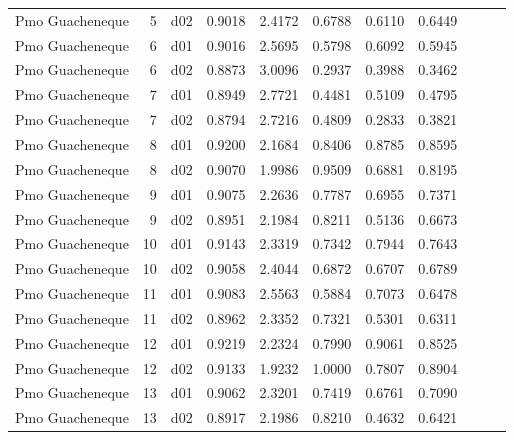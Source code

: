 \begin{landscape}
\begin{longtable}{p{2cm}rrrrrrrrrr}
      Pmo Guacheneque  &          5 &     d02 &   0.9018 &  2.4172 &        0.6788 &           0.6110 &  0.6449 \\
      Pmo Guacheneque  &          6 &     d01 &   0.9016 &  2.5695 &        0.5798 &           0.6092 &  0.5945 \\
      Pmo Guacheneque  &          6 &     d02 &   0.8873 &  3.0096 &        0.2937 &           0.3988 &  0.3462 \\
      Pmo Guacheneque  &          7 &     d01 &   0.8949 &  2.7721 &        0.4481 &           0.5109 &  0.4795 \\
      Pmo Guacheneque  &          7 &     d02 &   0.8794 &  2.7216 &        0.4809 &           0.2833 &  0.3821 \\
      Pmo Guacheneque  &          8 &     d01 &   0.9200 &  2.1684 &        0.8406 &           0.8785 &  0.8595 \\
      Pmo Guacheneque  &          8 &     d02 &   0.9070 &  1.9986 &        0.9509 &           0.6881 &  0.8195 \\
      Pmo Guacheneque  &          9 &     d01 &   0.9075 &  2.2636 &        0.7787 &           0.6955 &  0.7371 \\
      Pmo Guacheneque  &          9 &     d02 &   0.8951 &  2.1984 &        0.8211 &           0.5136 &  0.6673 \\
      Pmo Guacheneque  &         10 &     d01 &   0.9143 &  2.3319 &        0.7342 &           0.7944 &  0.7643 \\
      Pmo Guacheneque  &         10 &     d02 &   0.9058 &  2.4044 &        0.6872 &           0.6707 &  0.6789 \\
      Pmo Guacheneque  &         11 &     d01 &   0.9083 &  2.5563 &        0.5884 &           0.7073 &  0.6478 \\
      Pmo Guacheneque  &         11 &     d02 &   0.8962 &  2.3352 &        0.7321 &           0.5301 &  0.6311 \\
      Pmo Guacheneque  &         12 &     d01 &   0.9219 &  2.2324 &        0.7990 &           0.9061 &  0.8525 \\
      Pmo Guacheneque  &         12 &     d02 &   0.9133 &  1.9232 &        1.0000 &           0.7807 &  0.8904 \\
      Pmo Guacheneque  &         13 &     d01 &   0.9062 &  2.3201 &        0.7419 &           0.6761 &  0.7090 \\
      Pmo Guacheneque  &         13 &     d02 &   0.8917 &  2.1986 &        0.8210 &           0.4632 &  0.6421 \\

\end{longtable}
\end{landscape}
